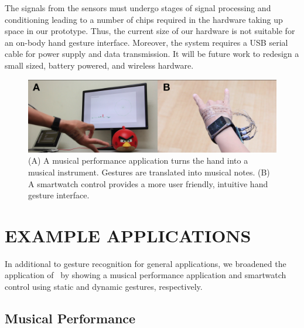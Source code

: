 \documentclass{sigchi}
\begin{document}
The signals from the sensors must undergo stages of signal processing and conditioning leading to a number of chips required in the hardware taking up space in our prototype. Thus, the current size of our hardware is not suitable for an on-body hand gesture interface. Moreover, the system requires a USB serial cable for power supply and data transmission. It will be future work to redesign a small sized, battery powered, and wireless hardware.

\begin{figure}[h]
  \begin{center}
  \includegraphics[width=1\columnwidth]{figures/apps.jpg}
  \caption{(A) A musical performance application turns the hand into a musical instrument. Gestures are translated into musical notes. (B) A smartwatch control provides a more user friendly, intuitive hand gesture interface.}
  \label{fig:APPS}
  \end{center}
\end{figure}

\section{EXAMPLE APPLICATIONS}

In additional to gesture recognition for general applications, we broadened the application of \getTitleName\ by showing a musical performance application and smartwatch control using static and dynamic gestures, respectively.

\subsection{Musical Performance}
\end{document}
